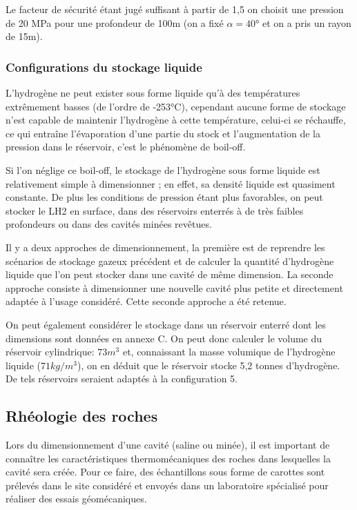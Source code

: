 \documentclass[11pt,french,a4paper]{article}
\begin{document}
Le facteur de sécurité étant jugé suffisant à partir de 1,5 on choisit une pression de 20 MPa pour une profondeur de 100m (on a fixé $\alpha = 40°$ et on a pris un rayon de 15m).\\

\subsubsection{Configurations du stockage liquide}
L’hydrogène ne peut exister sous forme liquide qu'à des températures extrêmement basses (de l’ordre de -253°C), cependant aucune forme de stockage n’est capable de maintenir l’hydrogène à cette température, celui-ci se réchauffe, ce qui entraîne l’évaporation d’une partie du stock et l’augmentation de la pression dans le réservoir, c’est le phénomène de boil-off.

Si l’on néglige ce boil-off, le stockage de l’hydrogène sous forme liquide est relativement simple à dimensionner ; en effet, sa densité liquide est quasiment constante.
De plus les conditions de pression étant plus favorables, on peut stocker le LH2 en surface, dans des réservoirs enterrés à de très faibles profondeurs ou dans des cavités minées revêtues.

Il y a deux approches de dimensionnement, la première est de reprendre les scénarios de stockage gazeux précédent et de calculer la quantité d’hydrogène liquide que l’on peut stocker dans une cavité de même dimension. La seconde approche consiste à dimensionner une nouvelle cavité plus petite et directement adaptée à l’usage considéré. Cette seconde approche a été retenue.

On peut également considérer le stockage dans un réservoir enterré dont les dimensions sont données en annexe C. On peut donc calculer le volume du réservoir cylindrique: $73 m^3$ et, connaissant la masse volumique de l’hydrogène liquide ($71 kg/m^3$), on en déduit que le réservoir stocke 5,2 tonnes d’hydrogène. De tels réservoirs seraient adaptés à la configuration 5.



\subsection{Rhéologie des roches}

Lors du dimensionnement d’une cavité (saline ou minée), il est important de connaître les caractéristiques thermomécaniques des roches dans lesquelles la cavité sera créée. Pour ce faire, des échantillons sous forme de carottes sont prélevés dans le site considéré et envoyés dans un laboratoire spécialisé pour réaliser des essais géomécaniques. \\
 
\end{document}
